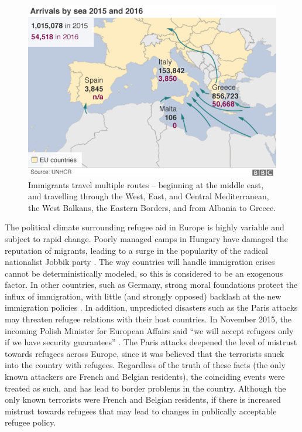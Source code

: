 \documentclass{article}
\begin{document}
\begin{figure}[h]
\begin{center}
\includegraphics[scale=0.5]{travelmap}
\caption{Immigrants travel multiple routes -- beginning at the middle east, and travelling through the West, East, and Central Mediterranean, the West Balkans, the Eastern Borders, and from Albania to Greece. \cite{BBCgraphics}}
\end{center}
\end{figure}

The political climate surrounding refugee aid in Europe is highly variable and subject to rapid change. Poorly managed camps in Hungary have damaged the reputation of migrants, leading to a surge in the popularity of the radical nationalist Jobbik party \cite{thorpe}. The way countries will handle immigration crises cannot be deterministically modeled, so this is considered to be an exogenous factor. In other countries, such as Germany, strong moral foundations protect the influx of immigration, with little (and strongly opposed) backlash at the new immigration policies \cite{hill}. In addition, unpredicted disasters such as the Paris attacks may threaten refugee relations with their host countries. In November 2015, the incoming Polish Minister for European Affairs said ``we will accept refugees only if we have security guarantees'' \cite{hewitt}. The Paris attacks deepened the level of mistrust towards refugees across Europe, since it was believed that the terrorists snuck into the country with refugees. Regardless of the truth of these facts (the only known attackers are French and Belgian residents), the coinciding events were treated as such, and has lead to border problems in the country. Although the only known terrorists were French and Belgian residents, if there is increased mistrust towards refugees that may lead to changes in publically acceptable refugee policy.
\end{document}
